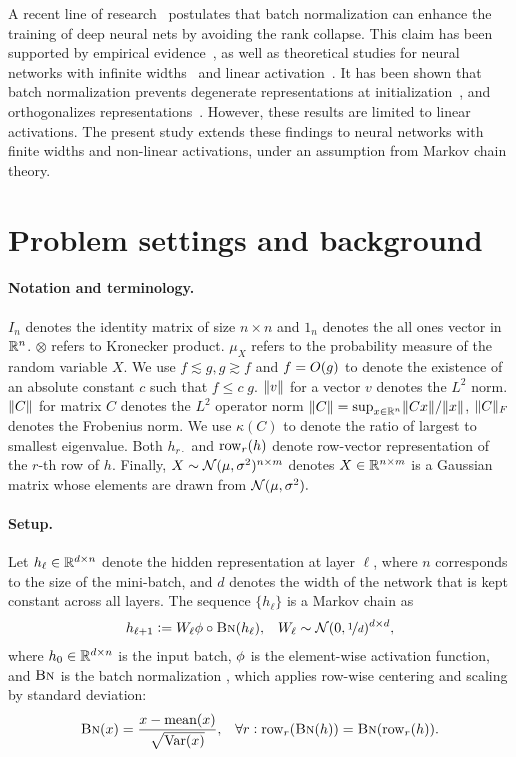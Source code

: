 A recent line of research~\cite{daneshmand2020batch} postulates that batch normalization can enhance the training of deep neural nets by avoiding the rank collapse. This claim has been supported by empirical evidence~\cite{yang2018a,daneshmand2020batch}, as well as theoretical studies for neural networks with infinite widths~\cite{yang2018a} and linear activation~\cite{daneshmand2021batch}. It has been shown that batch normalization prevents degenerate representations at initialization~\cite{daneshmand2020batch}, and orthogonalizes representations~\cite{daneshmand2021batch}. However, these results are limited to linear activations.
The present study extends these findings to neural networks with finite widths and non-linear activations, under an assumption from Markov chain theory. 


\section{Problem settings and background}

\paragraph{Notation and terminology.}
$I_n$ denotes the identity matrix of size $n\times n$ and $1_n$ denotes the all ones vector in $\mathbb{R}^n$.  
$\otimes$ refers to Kronecker product. $\mu_X$ refers to the probability measure of the random variable $X$. We use $f\lesssim g, g \gtrsim f$ and $f = {O}(g)$ to denote the existence of an absolute constant $c$ such that $f\le c\; g.$ 
$\lVert v\rVert$ for a vector $v$ denotes the $L^2$ norm.
$\lVert C\rVert$ for matrix $C$ denotes the $L^2$ operator norm $\lVert C\rVert=\sup_{x\in\mathbb{R}^n}\lVert C x\rVert/\lVert x\rVert$, $\lVert C\rVert_F$ denotes the Frobenius norm. We use $\kappa(C)$ to denote the ratio of largest to smallest eigenvalue. Both $h_{r\cdot}$ and ${\mathrm{row}}_r(h)$ denote row-vector representation of the $r$-th row of $h.$ Finally, $X\sim \mathcal{N}(\mu,\sigma^2)^{n\times m}$ denotes $X\in\mathbb{R}^{n\times m}$ is a Gaussian matrix whose elements are drawn \iid from $\mathcal{N}(\mu,\sigma^2).$ 

\paragraph{Setup.}
Let $h_\ell\in \mathbb{R}^{d\times n}$ denote the hidden representation at layer $\ell$, where $n$ corresponds to the size of the mini-batch, and $d$ denotes the width of the network that is kept constant across all layers. The sequence  $\{h_\ell\}$ is a Markov chain as
\begin{align}\label{MF:eq:chain}
h_{\ell+1}:=W_\ell \phi\circ\text{\sc{Bn}}(h_\ell), && W_\ell\sim\mathcal{N}(0,\nicefrac1d)^{d\times d},
\end{align}
where $h_0\in\mathbb{R}^{d\times n}$ is the input batch, $\phi$ is the element-wise activation function, and $\text{\sc{Bn}}$ is the batch normalization \cite{ioffe2015batch}, which applies row-wise centering and scaling by standard deviation:
\begin{align*}
\text{\sc{Bn}}(x) = \frac{x - \text{mean}(x)}{\sqrt{\text{Var}(x)}}, && \forall r: {\mathrm{row}}_r(\text{\sc{Bn}}(h)) = \text{\sc{Bn}}({\mathrm{row}}_r(h)).
\end{align*} 
  

